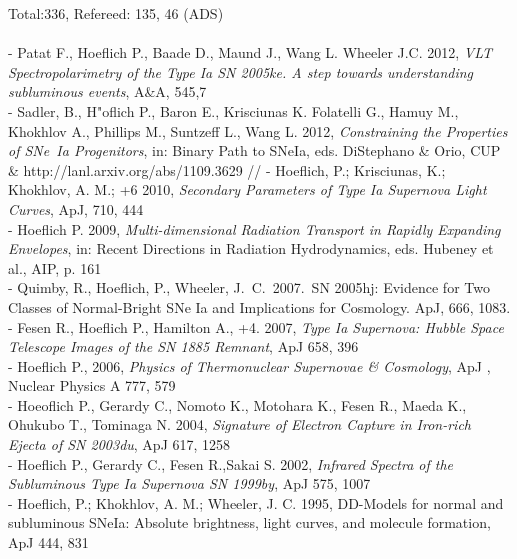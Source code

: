  Total:336, Refereed: 135,
 46 (ADS)                                      \\

      \\
\noindent
- Patat F., Hoeflich P., Baade D.,  Maund J., Wang L. Wheeler J.C. 2012,
{\sl  VLT Spectropolarimetry of the Type Ia SN 2005ke. A step towards understanding subluminous events},
 A\&A, 545,7                                                   \\
\noindent
- Sadler, B., H"oflich P., Baron E., Krisciunas K. Folatelli G., Hamuy M., Khokhlov A., Phillips M., Suntzeff L., Wang L.  2012,
{\sl  Constraining the Properties of SNe~Ia Progenitors}, in: Binary Path to SNeIa, eds. DiStephano \& Orio, CUP \& http://lanl.arxiv.org/abs/1109.3629    //
\noindent
- Hoeflich, P.; Krisciunas, K.; Khokhlov, A. M.; +6 2010, {\sl Secondary Parameters of Type Ia Supernova Light Curves}, ApJ, 710, 444                    \\
\noindent
- Hoeflich P. 2009, {\sl Multi-dimensional Radiation Transport in Rapidly Expanding Envelopes}, in:
Recent Directions in Radiation Hydrodynamics, eds. Hubeney et al., AIP, p. 161                                                \\
\noindent
- Quimby, R., H{oe}flich, P., Wheeler, J.~C.\ 2007.\ SN 2005hj: Evidence for Two Classes of
Normal-Bright SNe Ia and Implications for Cosmology.  ApJ, 666, 1083.                                                           \\
\noindent
- Fesen R., Hoeflich P., Hamilton A., +4. 2007, {\sl Type Ia Supernova: Hubble Space Telescope Images of the SN 1885 Remnant}, ApJ 658, 396   \\
\noindent
- Hoeflich P., 2006,
{\sl  Physics of Thermonuclear Supernovae \& Cosmology},
 ApJ , Nuclear Physics A 777, 579                                                                               \\
\noindent
- Hoeoflich P., Gerardy C., Nomoto K., Motohara K., Fesen R., Maeda K., Ohukubo T., Tominaga N.  2004, 
{\sl Signature of Electron Capture in Iron-rich Ejecta of SN 2003du}, ApJ 617, 1258               \\
\noindent
- Hoeflich P., Gerardy C., Fesen R.,Sakai S. 2002, {\sl Infrared Spectra of the Subluminous Type Ia Supernova SN 1999by}, ApJ 575, 1007     \\
\noindent
- Hoeflich, P.; Khokhlov, A. M.; Wheeler, J. C. 1995, DD-Models for normal and subluminous SNeIa: Absolute brightness, light curves, and molecule formation, ApJ 444, 831 \\
 
